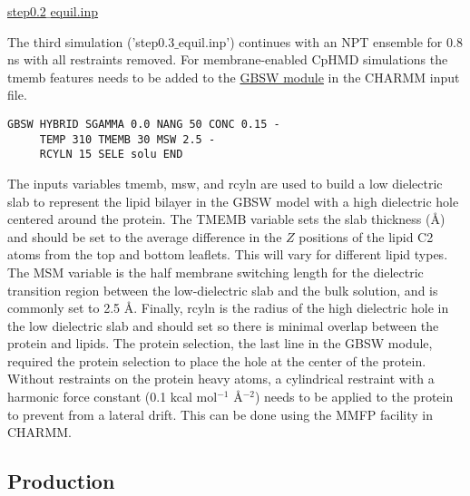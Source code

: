\href{https://gitlab.com/shenlab-amber-cphmd/cphmd-tutorial/-/tree/main/memb_hphmd_charmm/cphmd_equil}{step0.2$\_$equil.inp}

The third simulation ('step0.3$\_$equil.inp') continues with an NPT ensemble for 0.8 ns with all restraints removed. 
For membrane-enabled CpHMD simulations the tmemb features needs to be added to the \href{https://hpc.nih.gov/apps/charmm/c42b2html/gbsw.html}{GBSW module} in the CHARMM input file. 
%
\begin{lstlisting}
GBSW HYBRID SGAMMA 0.0 NANG 50 CONC 0.15 - 
     TEMP 310 TMEMB 30 MSW 2.5 -
     RCYLN 15 SELE solu END
\end{lstlisting}
%
The inputs variables tmemb, msw, and rcyln are used to build a low dielectric slab to represent the lipid bilayer in the GBSW model with a high dielectric hole centered around the protein.
The TMEMB variable sets the slab thickness ($\mbox{\AA}$) and should be set to the average difference in the $Z$ positions of the lipid C2 atoms from the top and bottom leaflets. This will vary for different lipid types. 
The MSM variable is the half membrane switching length\cite{Im_Brooks_2003_Biophys.J.} for the dielectric transition region between the low-dielectric slab and the bulk solution, and is commonly set to 2.5 $\mbox{\AA}$.
Finally, rcyln is the radius of the high dielectric hole in the low dielectric slab and should set so there is minimal overlap between the protein and lipids.
The protein selection, the last line in the GBSW module, required the protein selection to place the hole at the center of the protein.
Without restraints on the protein heavy atoms, a cylindrical restraint with a harmonic force constant (0.1 kcal mol$^{-1}$ {\AA}$^{-2}$) needs to be applied to the protein to prevent from a lateral drift. 
This can be done using the MMFP facility in CHARMM.

\subsection{Production}


